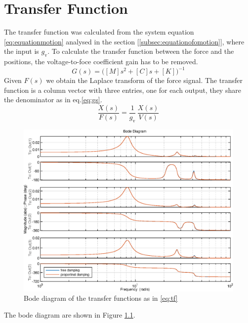 \chapter{Transfer Function}\label{chap:tf}
The transfer function was calculated from the system equation
\eqref{eq:equationmotion} analysed in the section
[\ref{subsec:equationofomotion}], where the input is \(g_{\text{v}}\).
To calculate the transfer function between the force and the positions, the 
voltage-to-foce coefficient gain has to be removed.
\begin{equation}\label{eq:gs}
	G(s) = \big([M]s^2+[C]s+[K]\big)^{-1}
\end{equation}
Given \(F(s)\) we obtain the Laplace transform of the force signal.
The transfer function is a column vector with three entries, one for each output,
they share the denominator as in eq.\eqref{eq:gs}.
\begin{equation}\label{eq:tf}
	\frac{X(s)}{F(s)} = \frac{1}{g_{\text{v}}}\,\frac{X(s)}{V(s)}
\end{equation}
%
\begin{figure}[htb]
	\centering
	\includegraphics[width=\linewidth]{bodediagram1}
	\caption{Bode diagram of the transfer functions as in \eqref{eq:tf}}
	\label{fig:bodeplot1}
\end{figure}
The bode diagram are shown in Figure \ref{fig:bodeplot1}.